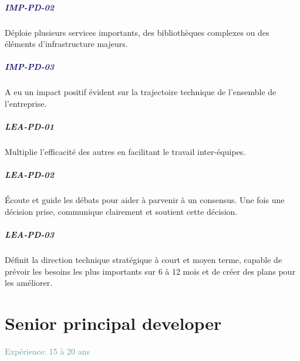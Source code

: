 \documentclass[a4paper, french, openany, 12pt]{book}
\newcommand\wis[1]{\textcolor{MidnightBlue}{\textbf{\uppercase{imp-{#1}}}}}
\newcommand\cha[1]{\textcolor{OliveGreen}{\textbf{\uppercase{lea-{#1}}}}}
\newcommand\xp[1]{\textcolor{CadetBlue}{Expérience: {#1} ans}}
\begin{document}
\begin{multicols}{2}
  \paragraph*{\wis{pd-02}}

  Déploie plusieurs services importants, des bibliothèques complexes ou des éléments d'infrastructure majeurs.

  \paragraph*{\wis{pd-03}}

  A eu un impact positif évident sur la trajectoire technique de l'ensemble de l'entreprise.

  \paragraph*{\cha{pd-01}}

  Multiplie l'efficacité des autres en facilitant le travail inter-équipes.

  \paragraph*{\cha{pd-02}}

  Écoute et guide les débats pour aider à parvenir à un consensus.
  Une fois une décision prise, communique clairement et soutient cette décision.

  \paragraph*{\cha{pd-03}}

  Définit la direction technique stratégique à court et moyen terme, capable de prévoir les besoins les plus importants 
  sur 6 à 12 mois et de créer des plans pour les améliorer.

\end{multicols}

\chapter{Senior principal developer}

\xp{15 à 20}
\end{document}
